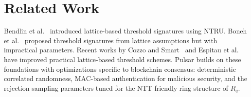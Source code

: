 \section{Related Work}

\label{sec:related}

Bendlin et al.~\cite{bendlin2013semi} introduced lattice-based threshold signatures
using NTRU. Boneh et al.~\cite{boneh2018threshold} proposed threshold signatures from
lattice assumptions but with impractical parameters. Recent works by Cozzo and
Smart~\cite{cozzo2023sharing} and Espitau et al.~\cite{espitau2024fiat} have improved
practical lattice-based threshold schemes. Pulsar builds on these foundations with
optimizations specific to blockchain consensus: deterministic correlated randomness,
MAC-based authentication for malicious security, and the rejection sampling parameters
tuned for the NTT-friendly ring structure of $R_q$.

